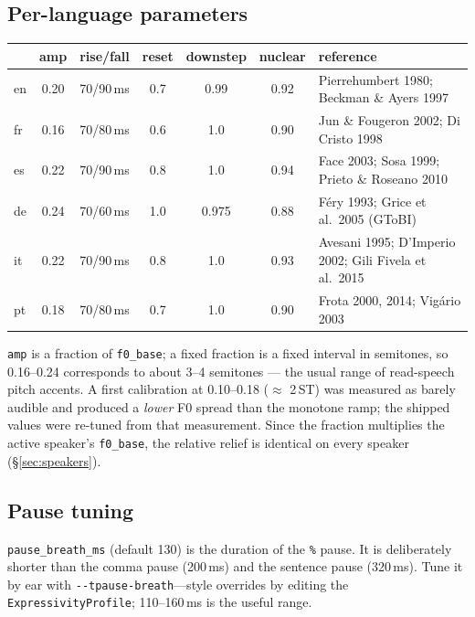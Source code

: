 \documentclass[11pt,a4paper]{article}
\newcommand{\ks}[1]{\texttt{#1}}
\begin{document}
\subsection{Per-language parameters}

\begin{small}
\begin{center}
\begin{tabularx}{\textwidth}{lcccccX}
\toprule
 & \textbf{amp} & \textbf{rise/fall} & \textbf{reset} & \textbf{downstep} & \textbf{nuclear} & \textbf{reference} \\
\midrule
en & 0.20 & 70/90\,ms & 0.7 & 0.99 & 0.92 & Pierrehumbert 1980; Beckman \& Ayers 1997 \\
fr & 0.16 & 70/80\,ms & 0.6 & 1.0 & 0.90 & Jun \& Fougeron 2002; Di Cristo 1998 \\
es & 0.22 & 70/90\,ms & 0.8 & 1.0 & 0.94 & Face 2003; Sosa 1999; Prieto \& Roseano 2010 \\
de & 0.24 & 70/60\,ms & 1.0 & 0.975 & 0.88 & F\'ery 1993; Grice et al.\ 2005 (GToBI) \\
it & 0.22 & 70/90\,ms & 0.8 & 1.0 & 0.93 & Avesani 1995; D'Imperio 2002; Gili Fivela et al.\ 2015 \\
pt & 0.18 & 70/80\,ms & 0.7 & 1.0 & 0.90 & Frota 2000, 2014; Vig\'ario 2003 \\
\bottomrule
\end{tabularx}
\end{center}
\end{small}

\begin{callout}
\texttt{amp} is a fraction of \texttt{f0\_base}; a fixed fraction
is a fixed interval in semitones, so 0.16--0.24 corresponds to
about 3--4 semitones --- the usual range of read-speech pitch
accents. A first calibration at 0.10--0.18 ($\approx$ 2\,ST) was
measured as barely audible and produced a \emph{lower} F0 spread
than the monotone ramp; the shipped values were re-tuned from that
measurement. Since the fraction multiplies the active speaker's
\texttt{f0\_base}, the relative relief is identical on every
speaker (\S\ref{sec:speakers}).
\end{callout}

\subsection{Pause tuning}

\texttt{pause\_breath\_ms} (default 130) is the duration of the
\ks{\%} pause. It is deliberately shorter than the comma pause
(200\,ms) and the sentence pause (320\,ms). Tune it by ear with
\texttt{-{}-tpause-breath}---style overrides by editing the
\texttt{ExpressivityProfile}; 110--160\,ms is the useful range.
\end{document}
